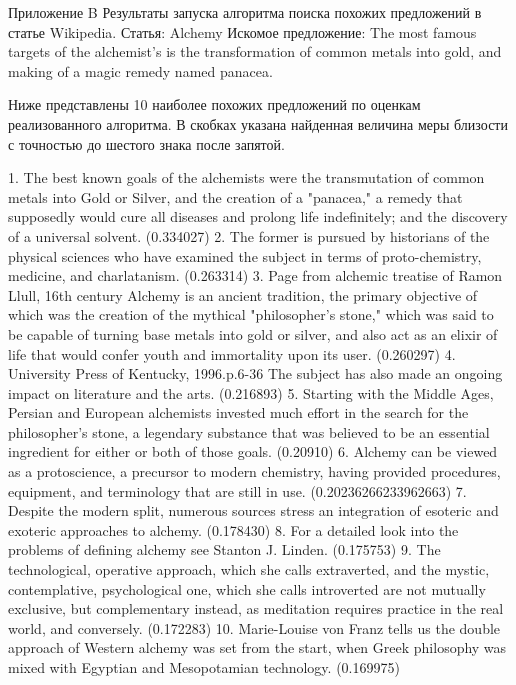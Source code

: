 Приложение B
Результаты запуска алгоритма поиска похожих предложений в статье Wikipedia.
Статья: Alchemy
Искомое предложение: The most famous targets of the alchemist's is the transformation of common metals into gold, and making of a magic remedy named panacea.

Ниже представлены 10 наиболее похожих предложений по оценкам реализованного алгоритма.
В скобках указана найденная величина меры близости с точностью до шестого знака после запятой.

1. The best known goals of the alchemists were the transmutation of common metals into Gold or Silver, and the creation of a "panacea," a remedy that supposedly would cure all diseases and prolong life indefinitely; and the discovery of a universal solvent. (0.334027)
2. The former is pursued by historians of the physical sciences who have examined the subject in terms of proto-chemistry, medicine, and charlatanism. (0.263314)
3. Page from alchemic treatise of Ramon Llull, 16th century Alchemy is an ancient tradition, the primary objective of which was the creation of the mythical "philosopher's stone," which was said to be capable of turning base metals into gold or silver, and also act as an elixir of life that would confer youth and immortality upon its user. (0.260297)
4. University Press of Kentucky, 1996.p.6-36  The subject has also made an ongoing impact on literature and the arts. (0.216893)
5. Starting with the Middle Ages, Persian and European alchemists invested much effort in the search for the philosopher's stone, a legendary substance that was believed to be an essential ingredient for either or both of those goals. (0.20910)
6. Alchemy can be viewed as a protoscience, a precursor to modern chemistry, having provided procedures, equipment, and terminology that are still in use. (0.20236266233962663)
7. Despite the modern split, numerous sources stress an integration of esoteric and exoteric approaches to alchemy. (0.178430)
8. For a detailed look into the problems of defining alchemy see Stanton J. Linden. (0.175753)
9. The technological, operative approach, which she calls extraverted, and the mystic, contemplative, psychological one, which she calls introverted are not mutually exclusive, but complementary instead, as meditation requires practice in the real world, and conversely. (0.172283)
10. Marie-Louise von Franz tells us the double approach of Western alchemy was set from the start, when Greek philosophy was mixed with Egyptian and Mesopotamian technology. (0.169975)
